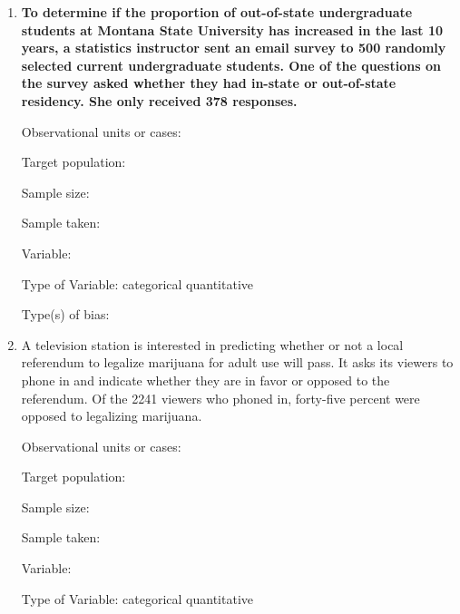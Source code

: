 \documentclass[
]{report}
\begin{document}
\begin{enumerate}
\def\labelenumi{\arabic{enumi}.}
\setcounter{enumi}{3}
\item
  \textbf{To determine if the proportion of out-of-state undergraduate students at Montana State University has increased in the last 10 years, a statistics instructor sent an email survey to 500 randomly selected current undergraduate students. One of the questions on the survey asked whether they had in-state or out-of-state residency. She only received 378 responses.}
  \vspace{0.25in}

  Observational units or cases:
  \vspace{0.3in}

  Target population:
  \vspace{0.3in}

  Sample size:
  \vspace{0.3in}

  Sample taken:
  \vspace{0.3in}

  Variable:
  \vspace{0.3in}

  Type of Variable: \hspace{1mm} categorical \hspace{0.2in} quantitative
  \vspace{1mm}

  Type(s) of bias:
  \vspace{0.3in}
\item
  A television station is interested in predicting whether or not a local referendum to legalize marijuana for adult use will pass. It asks its viewers to phone in and indicate whether they are in favor or opposed to the referendum. Of the 2241 viewers who phoned in, forty-five percent were opposed to legalizing marijuana.
  \vspace{0.1in}

  Observational units or cases:
  \vspace{0.3in}

  Target population:
  \vspace{0.3in}

  Sample size:
  \vspace{0.3in}

  Sample taken:
  \vspace{0.3in}

  Variable:
  \vspace{0.3in}

  Type of Variable: \hspace{1mm} categorical \hspace{0.2in} quantitative
  \vspace{1mm}


\end{enumerate}
\end{document}
